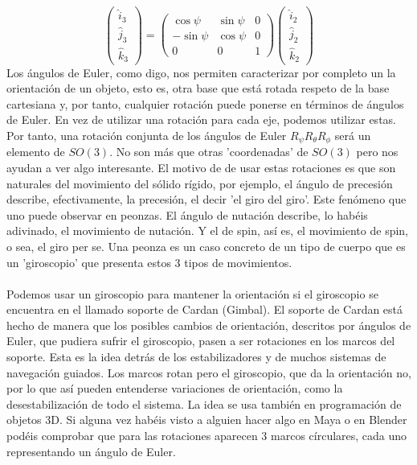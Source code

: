 \documentclass[12pt]{article}
\begin{document}
\begin{equation}
    \begin{pmatrix}
        \hat i_3 \\ \hat j_3 \\ \hat k_3 
    \end{pmatrix} =
    \begin{pmatrix}
        \cos \psi & \sin \psi & 0 \\ 
        -\sin \psi & \cos \psi  & 0 \\
        0 & 0 & 1 
    \end{pmatrix}
    \begin{pmatrix}
        \hat i_2 \\ \hat j_2 \\ \hat k_2
    \end{pmatrix}
\end{equation}
Los ángulos de Euler, como digo, nos permiten caracterizar por completo un la orientación de un objeto, esto es, otra base que está rotada respeto de la base cartesiana y, por tanto, cualquier rotación  puede ponerse en términos de ángulos de Euler. En vez de utilizar una rotación para cada eje, podemos utilizar estas. Por tanto, una rotación conjunta de los ángulos de Euler $R_\psi R_\theta R_\phi$ será un elemento de $SO(3)$. No son más que otras 'coordenadas' de $SO(3)$ pero nos ayudan a ver algo interesante. El motivo de de usar estas rotaciones es que son naturales del movimiento del sólido rígido, por ejemplo, el ángulo de precesión describe, efectivamente, la precesión, el decir 'el giro del giro'. Este fenómeno que uno puede observar en peonzas. El ángulo de nutación describe, lo habéis adivinado, el movimiento de nutación. Y el de spin, así es, el movimiento de spin, o sea, el giro per se. Una peonza es un caso concreto de un tipo de cuerpo que es un 'giroscopio' que presenta estos 3 tipos de movimientos. 
\\\\
Podemos usar un giroscopio para mantener la orientación si el giroscopio se encuentra en el llamado soporte de Cardan (Gimbal). El soporte de Cardan está hecho de manera que los posibles cambios de orientación, descritos por ángulos de Euler, que pudiera sufrir el giroscopio, pasen a ser rotaciones en los marcos del soporte. Esta es la idea detrás de los estabilizadores y de muchos sistemas de navegación guiados. Los marcos rotan pero el giroscopio, que da la orientación no, por lo que así pueden entenderse variaciones de orientación, como la desestabilización de todo el sistema. La idea se usa también en programación de objetos 3D. Si alguna vez habéis visto a alguien hacer algo en Maya o en Blender podéis comprobar que para las rotaciones aparecen 3 marcos círculares, cada uno representando un ángulo de Euler.\\ 
\end{document}
